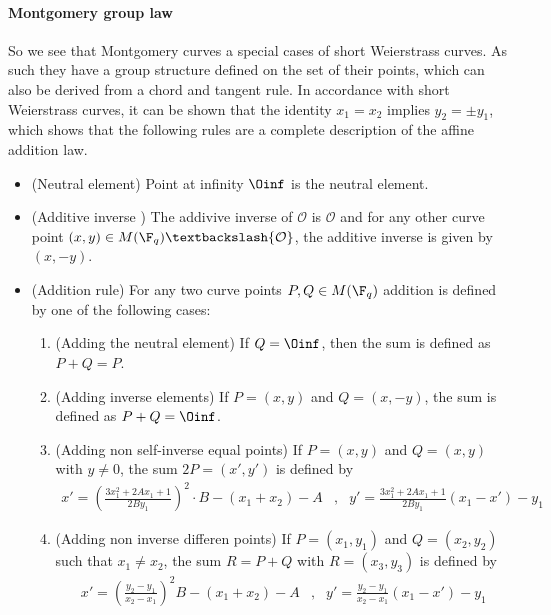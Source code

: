 \paragraph{Montgomery group law} So we see that Montgomery curves a special cases of short Weierstrass curves. As such they have a group structure defined on the set of their points, which can also be derived from a chord and tangent rule. In accordance with short Weierstrass curves, it can be shown that the identity $x_1=x_2$ implies $y_2=\pm y_1$, which shows that the following rules are a complete description of the affine addition law.
\begin{itemize}
\item (Neutral element) Point at infinity $\Oinf$ is the neutral element.
\item (Additive inverse ) The addivive inverse of $\mathcal{O}$ is $\mathcal{O}$ and for any other curve point $(x,y) \in M(\F_q)\textbackslash \{\mathcal{O}\}$, the additive inverse is given by $(x,-y)$.
\item (Addition rule) For any two curve points $P, Q \in M(\F_q)$ addition is defined by one of the following cases:
\begin{enumerate}
\item (Adding the neutral element) If $Q=\Oinf$, then the sum is defined as $P+Q=P$.
\item (Adding inverse elements)  If $P=(x,y)$ and $Q=(x,-y)$, the sum is defined as $P+Q=\Oinf$.
\item (Adding non self-inverse equal points) If $P=(x,y)$ and $Q=(x,y)$ with $y\neq 0$, the sum $2P=(x',y')$ is defined by
$$
\begin{array}{llr}
x' = (\frac{3x_1^2 + 2A x_1 +1}{2By_1})^2\cdot B - (x_1 + x_2) - A &,&
y' = \frac{3x_1^2 + 2A x_1 +1}{2By_1}(x_1-x') - y_1
\end{array} 
$$
\item (Adding non inverse differen points) If $P=(x_1,y_1)$ and $Q=(x_2,y_2)$ such that $x_1 \neq x_2$, the sum $R=P+Q$ with $R=(x_3,y_3)$ is defined by
$$
\begin{array}{llr}
x' = (\frac{y_2-y_1}{x_2-x_1})^2B - (x_1 + x_2) - A &, &
y' = \frac{y_2-y_1}{x_2-x_1}(x_1-x') - y_1
\end{array} 
$$
\end{enumerate}
\end{itemize} 
